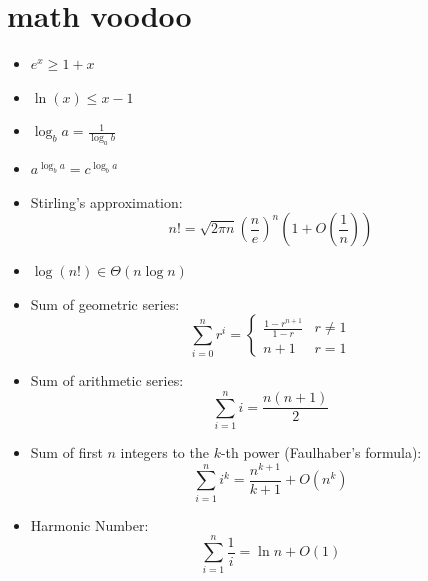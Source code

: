 \section{math voodoo}
\begin{itemize}
  \item $e^{x}\ge 1+x$
  \item $\ln(x)\le x-1$
  \item $\log_b{a}=\frac{1}{\log_a{b}}$
  \item $a^{\log_{b}{a}}=c^{\log_b{a}}$
  \item Stirling's approximation:
    \[n!=\sqrt{2\pi n}{\left(\frac{n}{e}\right)}^n
    \left(1+O\left(\frac{1}{n}\right)\right)\]
  \item $\log\left( n\mathpunct{!} \right) \in \Theta\left( n\log {n} \right) $
  \item  Sum of geometric series:
    \[\sum_{i=0}^n r^i=\begin{cases}
      \frac{1-r^{n+1}}{1-r} & r\neq 1\\
      n+1 & r=1
    \end{cases}\]
  \item Sum of arithmetic series:
    \[\sum_{i=1}^n i=\frac{n(n+1)}{2}\]
  \item Sum of first $n$ integers to the $k$-th power (Faulhaber's formula):
    \[\sum_{i=1}^n i^k=\frac{n^{k+1}}{k+1}+O(n^k)\]
  \item Harmonic Number:
    \[\sum_{i=1}^n \frac{1}{i}=\ln n + O(1)\]
\end{itemize}
